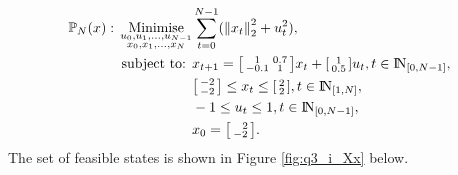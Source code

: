 \documentclass[a4paper,11pt,reqno]{amsart}
\newcommand{\N}{{\rm I\!N}}
\begin{document}
\begin{subequations}
    \begin{align}
        \mathbb{P}_N(x){}:{}
        \operatorname*{Minimise}_{\substack{u_0,u_1,\ldots,u_{N-1}\\ x_0,x_1,\ldots,x_N}}&\sum_{t=0}^{N-1} (\left\lVert x_t\right\rVert ^2_2+u_t^2),
        \\
        \text{subject to: }& x_{t+1} = 
        \begin{bsmallmatrix}
            1&0.7\\
            -0.1&1
        \end{bsmallmatrix}x_t + 
        \begin{bsmallmatrix}
            1\\
            0.5
        \end{bsmallmatrix}u_t, t\in\N_{[0,N-1]},
        \\
        &\begin{bsmallmatrix}
            -2\\
            -2
        \end{bsmallmatrix} 
        \leq x_t \leq 
        \begin{bsmallmatrix}
            2\\
            2
        \end{bsmallmatrix}, t\in\N_{[1,N]},
        \\
        &-1 \leq u_t \leq 1, t\in\N_{[0,N-1]},
        \\
        & x_0=\begin{bsmallmatrix}\ \ 2\\-2\end{bsmallmatrix}.
    \end{align}
\end{subequations}
The set of feasible states is shown in Figure \ref{fig:q3_i_Xx} below.
\end{document}
